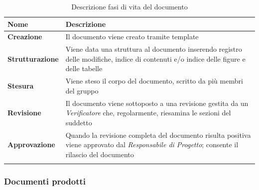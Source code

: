 {
	\setlength{\freewidth}{\dimexpr\textwidth-1\tabcolsep}
	\renewcommand{\arraystretch}{1.5}
	\setlength{\aboverulesep}{0pt}
	\setlength{\belowrulesep}{0pt}
	\begin{longtable}{L{.210\freewidth} L{.68\freewidth}}
		\textbf{Nome} & \textbf{Descrizione} \\
		\toprule
		\endhead		
		\textbf{Creazione} & Il documento viene creato tramite template \\ 
		\textbf{Strutturazione} & Viene data una struttura al documento inserendo registro delle modifiche, indice di contenuti e/o indice delle figure e delle tabelle\\
		\textbf{Stesura} & Viene steso il corpo del documento, scritto da più membri del gruppo \\ 
		\textbf{Revisione} & Il documento viene sottoposto a una revisione gestita da un \textit{Verificatore} che, regolarmente, riesamina le sezioni del suddetto \\
		\textbf{Approvazione} & Quando la revisione completa del documento risulta positiva viene approvato dal \textit{Responsabile di Progetto}; consente il rilascio del documento \\ 	
				
		\bottomrule
		\hiderowcolors
		\caption{Descrizione fasi di vita del documento}
	\end{longtable}

\subsubsection{Documenti prodotti \hfil}

}
